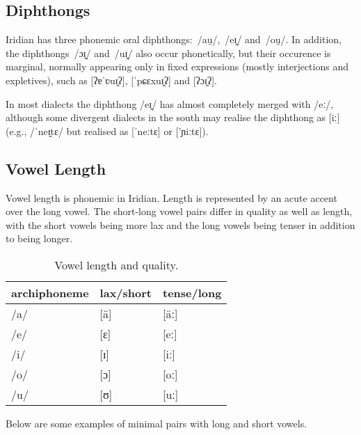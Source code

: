 \subsection{Diphthongs} Iridian has three phonemic oral
diphthongs: \,/au̯/, \,/eɪ̯/ and \,/ou̯/. In addition,
the diphthongs \,/ɔɪ̯/ and \,/uɪ̯/  also occur phonetically, but
their occurence is marginal, normally appearing only in fixed expressions
(mostly interjections and expletives), such as  [ʔɐˈʋuɪ̯ʔ],
 [ˈpɕɛxuɪ̯ʔ] and  [ʔɔɪ̯ʔ].

In most dialects the diphthong /eɪ̯/ has almost completely merged with 
/eː/, although some divergent dialects in the south may realise the diphthong as
[iː] (e.g.,  /ˈneɪ̯tɛ/ but realised as [ˈneːtɛ] or ['ɲiːtɛ]).

\subsection{Vowel Length}

Vowel length is phonemic in Iridian. Length is represented by an acute
accent over the long vowel. The short-long vowel pairs
differ in quality as well as length, with the short vowels being more lax and
the long vowels being tenser in addition to being longer.

\begin{table}[h!]
	\footnotesize\sffamily
	\caption{Vowel length and quality.}
	\medskip
	\begin{tabu} to 0.7
		\toprule
		{\sc archiphoneme} & {\sc lax/short} &{\sc tense/long}\\ \midrule
		/a/	& [\"a]	& [\"aː]		\\
		/e/	& [ɛ]	& [eː]		\\
		/i/	& [ɪ]	& [iː]		\\
		/o/	& [ɔ]	& [oː]		\\
		/u/	& [ʊ] & [uː]		\\
		\bottomrule
	\end{tabu}
\end{table}

Below are some examples of minimal pairs with long and short vowels.

\pex
{}

